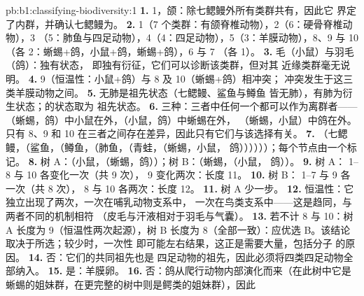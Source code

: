 \begin{solution}{pb:b1:classifying-biodiversity:1}
\textbf{1.}  1，颌：除七鳃鳗外所有类群共有，因此它
界定了内群，并确认七鳃鳗为。
\textbf{2.} 1（7 个类群：有颌脊椎动物），2（6：硬骨脊椎动物），3
（5：肺鱼与四足动物），4（4：四足动物），5（3：羊膜动物），8、9
与 10（各 2：蜥蜴+鸽，小鼠+鸽，蜥蜴+鸽），6 与 7
（各 1）。
\textbf{3.} 毛（小鼠）与羽毛（鸽）：独有状态，
即独有衍征，它们可以诊断该类群，但对其
近缘类群毫无说明。
\textbf{4.}  9（恒温性：小鼠+鸽）与 8 及 10（蜥蜴+鸽）相冲突；
冲突发生于这三类羊膜动物之间。
\textbf{5.} 无肺是祖先状态（七鳃鳗、鲨鱼与鳟鱼
皆无肺），有肺为衍生状态；的状态取为
祖先状态。
\textbf{6.} 三种：三者中任何一个都可以作为离群者——
（蜥蜴，鸽）中小鼠在外，（小鼠，鸽）中蜥蜴在外，
（蜥蜴，小鼠）中鸽在外。只有 8、9
和 10 在三者之间存在差异，因此只有它们与该选择有关。
\textbf{7.} （七鳃鳗，（鲨鱼，（鳟鱼，（肺鱼，（青蛙，（蜥蜴，小鼠，
鸽））））））；每个节点由一个标记。
\textbf{8.} 树 A：（小鼠，（蜥蜴，鸽））；树 B：（蜥蜴，（小鼠，
鸽））。
\textbf{9.} 树 A： 1--8 与 10 各变化一次（共 9 次），
9 变化两次：长度 \num{11}。
\textbf{10.} 树 B： 1--7 与 9 各一次（共 8 次）， 8 与
10 各两次：长度 \num{12}。
\textbf{11.} 树 A 少一步。
\textbf{12.} 恒温性：它独立出现了两次，一次在哺乳动物支系中，
一次在鸟类支系中——这是趋同，与两者不同的机制相符
（皮毛与汗液相对于羽毛与气囊）。
\textbf{13.} 若不计 8 与 10：树 A 长度为 9（恒温性两次起源），树
B 长度为 8（全部一致）：应优选 B。该结论
取决于所选；较少时，一次性
即可能左右结果，这正是需要大量，包括分子
的原因。
\textbf{14.} 否：它们的共同祖先也是
四足动物的祖先，因此必须将四类四足动物全部纳入。
\textbf{15.} 是：羊膜卵。
\textbf{16.} 否：鸽从爬行动物内部演化而来（在此树中它是
蜥蜴的姐妹群，在更完整的树中则是鳄类的姐妹群），因此

\end{solution}
